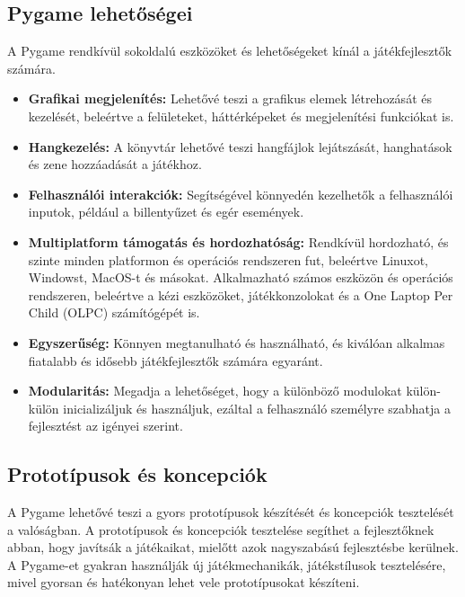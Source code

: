 \subsection{Pygame lehetőségei}
 A Pygame rendkívül sokoldalú eszközöket és lehetőségeket kínál a játékfejlesztők számára.

\begin{itemize}
    
\item    \textbf{Grafikai megjelenítés:} Lehetővé teszi a grafikus elemek létrehozását és kezelését, beleértve a felületeket, háttérképeket és megjelenítési funkciókat is.
    
\item    \textbf{Hangkezelés:} A könyvtár lehetővé teszi hangfájlok lejátszását, hanghatások és zene hozzáadását a játékhoz.
    
\item    \textbf{Felhasználói interakciók:} Segítségével könnyedén kezelhetők a felhasználói inputok, például a billentyűzet és egér események.
    
\item    \textbf{Multiplatform támogatás és hordozhatóság:} Rendkívül hordozható, és szinte minden platformon és operációs rendszeren fut, beleértve Linuxot, Windowst, MacOS-t és másokat. Alkalmazható számos eszközön és operációs rendszeren, beleértve a kézi eszközöket, játékkonzolokat és a One Laptop Per Child (OLPC) \cite{olpc} számítógépét is.
    
\item    \textbf{Egyszerűség:} Könnyen megtanulható és használható, és kiválóan alkalmas fiatalabb és idősebb játékfejlesztők számára egyaránt.
    
\item    \textbf{Modularitás:} Megadja a lehetőséget, hogy a különböző modulokat külön-külön inicializáljuk és használjuk, ezáltal a felhasználó személyre szabhatja a fejlesztést az igényei szerint.
\end{itemize}


\subsection{Prototípusok és koncepciók}
 A Pygame lehetővé teszi a gyors prototípusok készítését és koncepciók tesztelését a valóságban. A prototípusok és koncepciók tesztelése segíthet a fejlesztőknek abban, hogy javítsák a játékaikat, mielőtt azok nagyszabású fejlesztésbe kerülnek. A Pygame-et gyakran használják új játékmechanikák, játékstílusok tesztelésére, mivel gyorsan és hatékonyan lehet vele prototípusokat készíteni.

